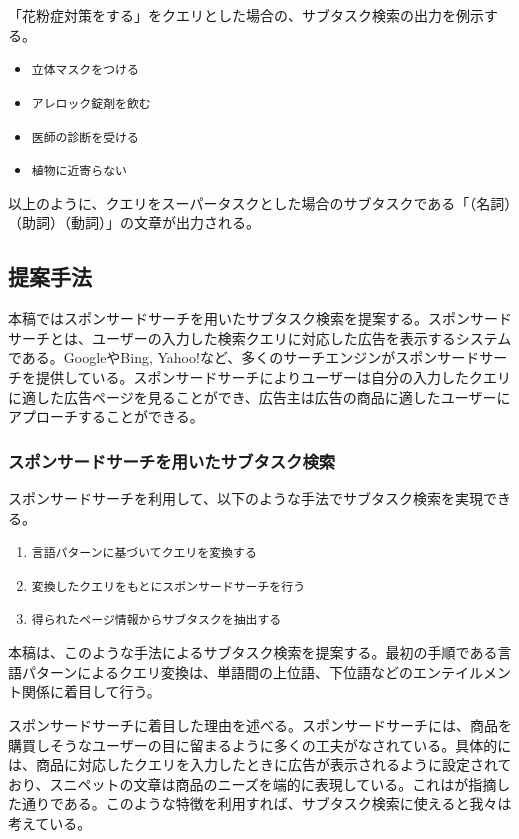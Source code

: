 \documentclass[submit,techreq]{ipsj}
\def\|{\verb|}
\begin{document}
「花粉症対策をする」をクエリとした場合の、サブタスク検索の出力を例示する。

\begin{itemize}
\item \|立体マスクをつける|
\item \|アレロック錠剤を飲む|
\item \|医師の診断を受ける|
\item \|植物に近寄らない|
\end{itemize}

以上のように、クエリをスーパータスクとした場合のサブタスクである「（名詞）（助詞）（動詞）」の文章が出力される。

\subsection{提案手法}
本稿ではスポンサードサーチを用いたサブタスク検索を提案する。スポンサードサーチとは、ユーザーの入力した検索クエリに対応した広告を表示するシステムである。GoogleやBing, Yahoo!など、多くのサーチエンジンがスポンサードサーチを提供している。スポンサードサーチによりユーザーは自分の入力したクエリに適した広告ページを見ることができ、広告主は広告の商品に適したユーザーにアプローチすることができる。


\subsubsection{スポンサードサーチを用いたサブタスク検索}
スポンサードサーチを利用して、以下のような手法でサブタスク検索を実現できる。

\begin{enumerate}
\item \|言語パターンに基づいてクエリを変換する|
\item \|変換したクエリをもとにスポンサードサーチを行う|
\item \|得られたページ情報からサブタスクを抽出する|
\end{enumerate}

本稿は、このような手法によるサブタスク検索を提案する。最初の手順である言語パターンによるクエリ変換は、単語間の上位語、下位語などのエンテイルメント関係に着目して行う。


スポンサードサーチに着目した理由を述べる。スポンサードサーチには、商品を購買しそうなユーザーの目に留まるように多くの工夫がなされている。具体的には、商品に対応したクエリを入力したときに広告が表示されるように設定されており、スニペットの文章は商品のニーズを端的に表現している。これは\cite{yamatake}が指摘した通りである。このような特徴を利用すれば、サブタスク検索に使えると我々は考えている。
\end{document}
